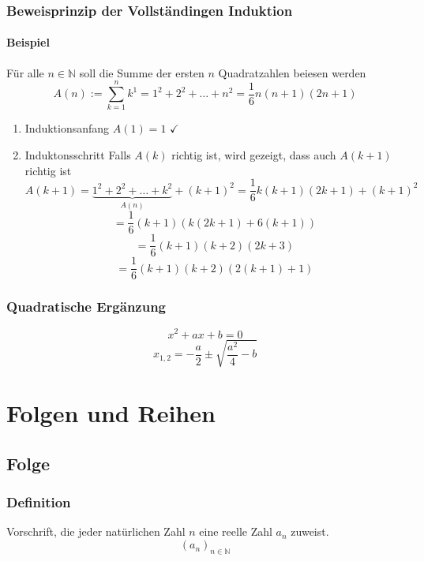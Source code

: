 \documentclass[a4paper]{scrartcl}
\begin{document}
\subsubsection{Beweisprinzip der Vollständingen Induktion}
\label{sec-2-2-5}
\paragraph{Beispiel}
\label{sec-2-2-5-1}
Für alle $n \in \mathbb{N}$ soll die Summe der ersten $n$ Quadratzahlen beiesen werden
\[A(n) := \sum_{k=1}^n{k^1} = 1^2 + 2^2 + \ldots + n^2 = \frac{1}{6}n(n+1)(2n+1)\]
\begin{enumerate}
\item Induktionsanfang $A(1) = 1$ $\checkmark$
\item Induktonsschritt Falls $A(k)$ richtig ist, wird gezeigt, dass auch $A(k+1)$ richtig ist
\[A(k+1) = \underbrace{1^2 + 2^2 + \ldots + k^2}_{A(n)} + (k+1)^2 = \frac{1}{6}k(k+1)(2k+1)+(k+1)^2\]
\[=\frac{1}{6}(k+1)(k(2k+1)+6(k+1))\]
\[=\frac{1}{6}(k+1)(k+2)(2k+3)\]
\[=\frac{1}{6}(k+1)(k+2)(2(k+1)+1)\]
\end{enumerate}

\subsubsection{Quadratische Ergänzung}
\label{sec-2-2-6}
\[x^2 + a x + b = 0\]
\[x_{1,2}=-\frac{a}{2}\pm \sqrt{\frac{a^2}{4}-b}\]

\section{Folgen und Reihen}
\label{sec-3}
\subsection{Folge}
\label{sec-3-1}
\subsubsection{Definition}
\label{sec-3-1-1}
Vorschrift, die jeder natürlichen Zahl $n$ eine reelle Zahl $a_n$ zuweist.
\[(a_n)_{n\in \mathbb{N}}\]
\end{document}
